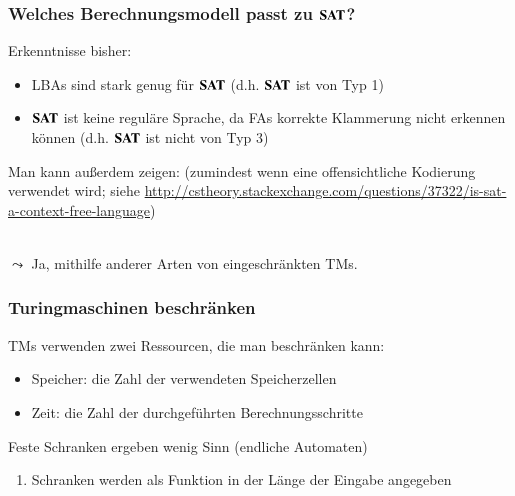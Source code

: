 \documentclass[onlymath]{beamer}
\begin{document}
\begin{frame}\frametitle{Welches Berechnungsmodell passt zu $\textbf{\textcolor{black}{SAT}}$?}

Erkenntnisse bisher:
\begin{itemize}
\item LBAs sind stark genug für $\textbf{\textcolor{black}{SAT}}$ (d.h. $\textbf{\textcolor{black}{SAT}}$ ist von Typ 1)
\item $\textbf{\textcolor{black}{SAT}}$ ist keine reguläre Sprache, da FAs korrekte Klammerung nicht erkennen können (d.h. $\textbf{\textcolor{black}{SAT}}$ ist nicht von Typ 3)
\end{itemize}\bigskip\pause

Man kann außerdem zeigen:
(zumindest wenn eine offensichtliche Kodierung verwendet wird; siehe
\url{http://cstheory.stackexchange.com/questions/37322/is-sat-a-context-free-language})
\bigskip\pause

\\\pause
$\leadsto$ Ja, mithilfe anderer Arten von eingeschränkten TMs.

\end{frame}


\begin{frame}\frametitle{Turingmaschinen beschränken}

TMs verwenden zwei Ressourcen, die man beschränken kann:
\begin{itemize}
\item \alert{Speicher:} die Zahl der verwendeten Speicherzellen
\item \alert{Zeit:} die Zahl der durchgeführten Berechnungsschritte
\end{itemize}\pause
Feste Schranken ergeben wenig Sinn (endliche Automaten)\\
\begin{enumerate}[$\leadsto$]
\item Schranken werden als Funktion in der Länge der Eingabe angegeben
\end{enumerate}
\bigskip


\end{frame}
\end{document}

